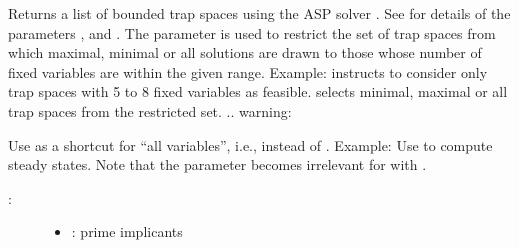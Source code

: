 \documentclass[letterpaper,10pt,english]{sphinxmanual}
\begin{document}
\begin{fulllineitems}
\label{\detokenize{AspSolver:PyBoolNet.AspSolver.trap_spaces_bounded}}
Returns a list of bounded trap spaces using the  ASP solver {\hyperref[\detokenize{Bibliography:gebser2011}]{}}.
See  for details of the parameters ,  and .
The parameter  is used to restrict the set of trap spaces from which maximal, minimal or all solutions are drawn
to those whose number of fixed variables are within the given range.
Example:  instructs  to consider only trap spaces with 5 to 8 fixed variables as feasible.
 selects minimal, maximal or all trap spaces from the restricted set.
.. warning:

\begin{sphinxVerbatim}[commandchars=\\\{\}]
           
                 
\end{sphinxVerbatim}

Use  as a shortcut for “all variables”, i.e., instead of .
Example: Use  to compute steady states.
Note that the parameter  becomes irrelevant for  with .
\begin{description}
\item[{:}] \leavevmode\begin{itemize}
\item {} 
: prime implicants


\end{itemize}
\end{description}
\end{fulllineitems}
\end{document}
